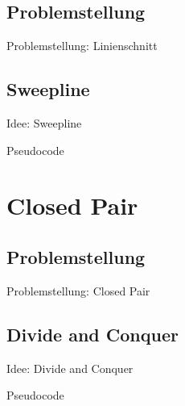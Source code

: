\documentclass[18pt]{beamer}
\begin{document}
	\subsection{Problemstellung}
		\begin{frame}{Problemstellung: Linienschnitt}
		\end{frame}
	
	\subsection{Sweepline}
		\begin{frame}{Idee: Sweepline}
	
		\end{frame}
	
		\begin{frame}{Pseudocode}
	
		\end{frame}
	
\section{Closed Pair}

	\subsection{Problemstellung}
		\begin{frame}{Problemstellung: Closed Pair}
		\end{frame}
	
	\subsection{Divide and Conquer}
		\begin{frame}{Idee: Divide and Conquer}
	
		\end{frame}
	
		\begin{frame}{Pseudocode}
	
		\end{frame}
	
\end{document}
